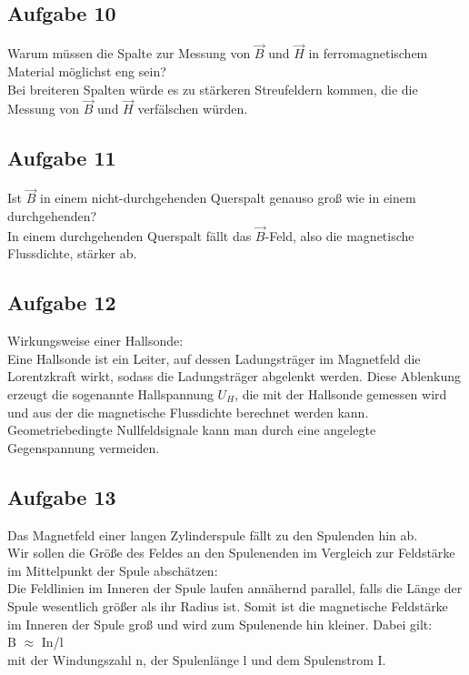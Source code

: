 \documentclass[a4paper,10pt]{scrartcl}
\begin{document}
\subsection{Aufgabe 10}
Warum müssen die Spalte zur Messung von $\vec{B}$ und $\vec{H}$ in ferromagnetischem Material möglichst eng sein? \\
Bei breiteren Spalten würde es zu stärkeren Streufeldern kommen, die die Messung von $\vec{B}$ und $\vec{H}$ verfälschen würden.
\subsection{Aufgabe 11}
Ist $\vec{B}$ in einem nicht-durchgehenden Querspalt genauso groß wie in einem durchgehenden? \\
In einem durchgehenden Querspalt fällt das $\vec{B}$-Feld, also die magnetische Flussdichte, stärker ab.
\subsection{Aufgabe 12}
Wirkungsweise einer Hallsonde: \\
Eine Hallsonde ist ein Leiter, auf dessen Ladungsträger im Magnetfeld die Lorentzkraft wirkt, sodass die Ladungsträger abgelenkt werden. Diese Ablenkung erzeugt die sogenannte Hallspannung $U_H$, die mit der Hallsonde gemessen wird und aus der die magnetische Flussdichte berechnet werden kann. \\
Geometriebedingte Nullfeldsignale kann man durch eine angelegte Gegenspannung vermeiden.
\subsection{Aufgabe 13}
Das Magnetfeld einer langen Zylinderspule fällt zu den Spulenden hin ab. \\
Wir sollen die Größe des Feldes an den Spulenenden im Vergleich zur Feldstärke im Mittelpunkt der Spule abschätzen: \\
Die Feldlinien im Inneren der Spule laufen annähernd parallel, falls die Länge der Spule wesentlich größer als ihr Radius ist. Somit ist die magnetische Feldstärke im Inneren der Spule groß und wird zum Spulenende hin kleiner. Dabei gilt: \\
B $\approx$ In/l \\
mit der Windungszahl n, der Spulenlänge l und dem Spulenstrom I.
\end{document}
